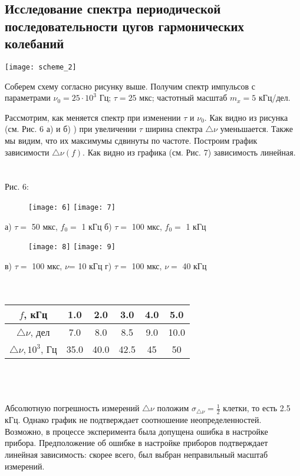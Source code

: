 \documentclass[a4paper,12pt]{article}
\begin{document}
\subsection{Исследование спектра периодической последовательности цугов гармонических колебаний}

\texttt{[image: scheme\_2]}

Соберем схему согласно рисунку выше. Получим спектр импульсов с параметрами \newline $\nu_0=25\cdot10^3$ Гц; $\tau=25$ мкс; частотный масштаб $m_x=5$ кГц/дел. 

Рассмотрим, как меняется спектр при изменении $\tau$ и $\nu_0$. Как видно из рисунка (см. Рис. 6 а) и б) ) при увеличении $\tau$ ширина спектра $\bigtriangleup\nu$ уменьшается. Также мы видим, что их максимумы сдвинуты по частоте. Построим график зависимости $\bigtriangleup\nu(f)$. Как видно из графика (см. Рис. 7) зависимость линейная.
\ \\
\ \\
Рис. 6: 
\begin{figure}[ht]
\texttt{[image: 6]}
\texttt{[image: 7]}
\end{figure}
\par \hspace{1.3cm} а) $\tau=$ 50 мкс, $f_0=$ 1 кГц  \hspace{3.6cm} б) $\tau=$ 100 мкс, $f_0=$ 1 кГц
\begin{figure}[ht]
\texttt{[image: 8]}
\hspace{3cm}
\texttt{[image: 9]}
\end{figure}
\par
\par \hspace{0.3cm} в) $\tau=$ 100 мкс, $\nu$= 10 кГц  \hspace{4cm} г) $\tau=$ 100 мкс, $\nu=$ 40 кГц
\ \\

\ \\
\ \\
\begin{tabular}{|c|c|c|c|c|c|}
	\hline
	$f$, кГц & 1.0 & 2.0 & 3.0 & 4.0 & 5.0  \\
	\hline
	$\bigtriangleup\nu$, дел & 7.0 & 8.0 & 8.5 & 9.0 & 10.0  \\
	\hline
	$\bigtriangleup\nu, 10^3$, Гц & 35.0 & 40.0 & 42.5 & 45 & 50  \\
	\hline
\end{tabular}
\ \\
\ \\
\ \\
Абсолютную погрешность измерений $\bigtriangleup\nu$ положим $\sigma_{\bigtriangleup\nu} = \frac{1}{2}$ клетки, то есть 2.5 кГц. Однако график не подтверждает соотношение неопределенностей. Возможно, в процессе эксперимента была допущена ошибка в настройке прибора. Предположение об ошибке в настройке приборов подтверждает линейная зависимость: скорее всего, был выбран неправильный масштаб измерений. 
\end{document}
